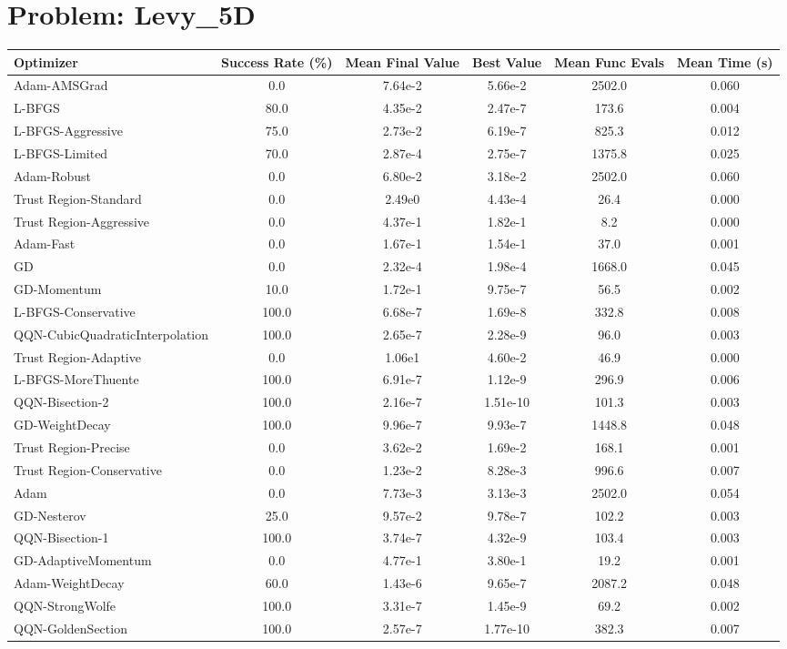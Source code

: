 \documentclass{article}
\begin{document}
\section{Problem: Levy\_5D}
\begin{longtable}{p{3cm}*{5}{c}}
\toprule
\textbf{Optimizer} & \textbf{Success Rate (\%)} & \textbf{Mean Final Value} & \textbf{Best Value} & \textbf{Mean Func Evals} & \textbf{Mean Time (s)} \\
\midrule
Adam-AMSGrad & 0.0 & 7.64e-2 & 5.66e-2 & 2502.0 & 0.060 \\
L-BFGS & 80.0 & 4.35e-2 & 2.47e-7 & 173.6 & 0.004 \\
L-BFGS-Aggressive & 75.0 & 2.73e-2 & 6.19e-7 & 825.3 & 0.012 \\
L-BFGS-Limited & 70.0 & 2.87e-4 & 2.75e-7 & 1375.8 & 0.025 \\
Adam-Robust & 0.0 & 6.80e-2 & 3.18e-2 & 2502.0 & 0.060 \\
Trust Region-Standard & 0.0 & 2.49e0 & 4.43e-4 & 26.4 & 0.000 \\
Trust Region-Aggressive & 0.0 & 4.37e-1 & 1.82e-1 & 8.2 & 0.000 \\
Adam-Fast & 0.0 & 1.67e-1 & 1.54e-1 & 37.0 & 0.001 \\
GD & 0.0 & 2.32e-4 & 1.98e-4 & 1668.0 & 0.045 \\
GD-Momentum & 10.0 & 1.72e-1 & 9.75e-7 & 56.5 & 0.002 \\
L-BFGS-Conservative & 100.0 & 6.68e-7 & 1.69e-8 & 332.8 & 0.008 \\
QQN-CubicQuadraticInterpolation & 100.0 & 2.65e-7 & 2.28e-9 & 96.0 & 0.003 \\
Trust Region-Adaptive & 0.0 & 1.06e1 & 4.60e-2 & 46.9 & 0.000 \\
L-BFGS-MoreThuente & 100.0 & 6.91e-7 & 1.12e-9 & 296.9 & 0.006 \\
QQN-Bisection-2 & 100.0 & 2.16e-7 & 1.51e-10 & 101.3 & 0.003 \\
GD-WeightDecay & 100.0 & 9.96e-7 & 9.93e-7 & 1448.8 & 0.048 \\
Trust Region-Precise & 0.0 & 3.62e-2 & 1.69e-2 & 168.1 & 0.001 \\
Trust Region-Conservative & 0.0 & 1.23e-2 & 8.28e-3 & 996.6 & 0.007 \\
Adam & 0.0 & 7.73e-3 & 3.13e-3 & 2502.0 & 0.054 \\
GD-Nesterov & 25.0 & 9.57e-2 & 9.78e-7 & 102.2 & 0.003 \\
QQN-Bisection-1 & 100.0 & 3.74e-7 & 4.32e-9 & 103.4 & 0.003 \\
GD-AdaptiveMomentum & 0.0 & 4.77e-1 & 3.80e-1 & 19.2 & 0.001 \\
Adam-WeightDecay & 60.0 & 1.43e-6 & 9.65e-7 & 2087.2 & 0.048 \\
QQN-StrongWolfe & 100.0 & 3.31e-7 & 1.45e-9 & 69.2 & 0.002 \\
QQN-GoldenSection & 100.0 & 2.57e-7 & 1.77e-10 & 382.3 & 0.007 \\
\bottomrule
\end{longtable}
\end{document}
